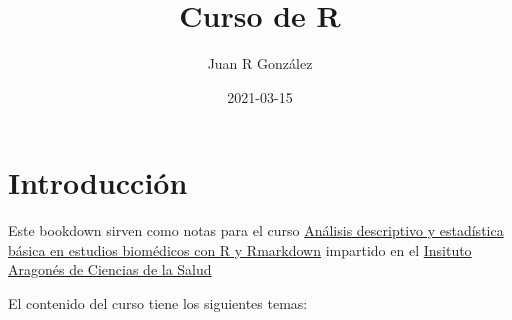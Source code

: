 \documentclass[
]{book}
\title{Curso de R}
\author{Juan R González}
\date{2021-03-15}
\begin{document}
\maketitle

{
\setcounter{tocdepth}{1}
\tableofcontents
}
\hypertarget{introducciuxf3n}{%
\chapter{Introducción}\label{introducciuxf3n}}

Este bookdown sirven como notas para el curso \href{https://www.iisaragon.es/event/curso-analisis-descriptivo-y-estadistica-basica-en-estudios-biomedicos-con-r-y-rmarkdown-edicion-2020-iacs/}{Análisis descriptivo y estadística básica en estudios biomédicos con R y Rmarkdown} impartido en el \href{https://www.iacs.es/}{Insituto Aragonés de Ciencias de la Salud}

El contenido del curso tiene los siguientes temas:
\end{document}
